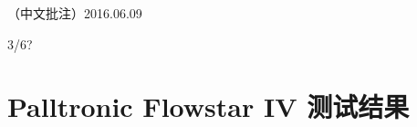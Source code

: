 \documentclass[UTF8,10pt,a4paper,fontset=fandol]{ctexart}
\newcommand{\handwritten}[1]{#1}
\begin{document}
\handwritten{（中文批注）2016.06.09}

\vspace{1em}

\handwritten{3/6?}

\newpage

\section*{Palltronic Flowstar IV 测试结果}
\end{document}

